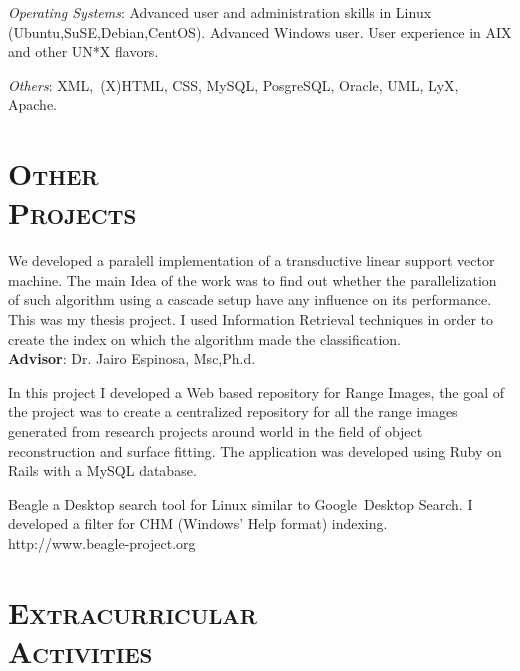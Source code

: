 \begin{resume}
\emph{Operating Systems}: Advanced user and administration skills in
Linux (Ubuntu,SuSE,Debian,CentOS). Advanced Windows user. User
experience in  AIX and  other UN*X flavors.

\emph{Others}: XML,\ (X)HTML, CSS, MySQL, PosgreSQL, Oracle, UML, LyX, Apache.


\section{\textsc{Other\\  Projects}}

\begin{position}
We developed a paralell implementation of a transductive
linear support vector machine. The main Idea of the work was
to find out whether the parallelization of such algorithm using a cascade
setup have any influence on its performance. This was my thesis
project. I used Information Retrieval techniques in order to create
the index on which the algorithm made the classification.
\\
\textbf{Advisor}:  Dr. Jairo Espinosa, Msc,Ph.d.
\end{position}

\begin{position}
 In this project I developed a Web based repository for Range Images, the goal of the
 project was to create a centralized repository for all the range
 images generated from research projects around world in the field of
 object reconstruction and surface fitting. The application was
 developed using Ruby on Rails with a MySQL database.
\end{position}

\begin{position}
Beagle a Desktop search tool  for Linux similar to
Google\texttrademark  \  Desktop
Search. I developed a filter for CHM (Windows' Help format) indexing.
http://www.beagle-project.org
\end{position}

\section{\textsc{Extracurricular\\ Activities}}


\end{resume}
